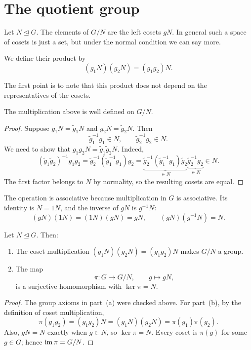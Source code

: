 \documentclass[reqno,11pt]{amsart}
\begin{document}
\makelecturetitle

\section{The quotient group}

Let $N\trianglelefteq G$. The elements of $G/N$ are the left cosets
$gN$. In general such a space of cosets is just a set, but under the normal condition we can say more.

We define their product by
\[
  (g_1N)(g_2N)=(g_1g_2)N.
\]

The first point is to note that this product does not depend on the
representatives of the cosets.

\begin{proposition}\label{prop:well-defined}
The multiplication above is well defined on $G/N$.
\end{proposition}
\begin{proof}
Suppose $g_1N=\widetilde g_1N$ and
$g_2N=\widetilde g_2N$. Then
\[
  \widetilde g_1^{-1}g_1\in N,
  \qquad \widetilde g_2^{-1}g_2\in N.
\]
We need to show that $g_1g_2N=\widetilde g_1\widetilde g_2N$.
Indeed,
\[
  (\widetilde g_1\widetilde g_2)^{-1}g_1g_2
  =\widetilde g_2^{-1}(\widetilde g_1^{-1}g_1)g_2
  =\underbrace{\widetilde g_2^{-1}(\widetilde g_1^{-1}g_1)
       \widetilde g_2}_{\in N}
    \underbrace{\widetilde g_2^{-1}g_2}_{\in N}
  \in N.
\]
The first factor belongs to $N$ by normality, so the resulting
cosets are equal.
\end{proof}

The operation is associative because multiplication in $G$ is
associative. Its identity is $N=1N$, and the inverse of $gN$ is
$g^{-1}N$:
\[
  (gN)(1N)=(1N)(gN)=gN,
  \qquad (gN)(g^{-1}N)=N.
\]

\begin{theorem}\label{thm:quotient-group}\label{thm:quotient-map}
Let $N\trianglelefteq G$. Then:
\begin{enumerate}[label=\textup{(\alph*)}]
\item The coset multiplication
$(g_1N)(g_2N)=(g_1g_2)N$ makes $G/N$ a group.
\item The map
\[
  \pi:G\longrightarrow G/N,\qquad g\longmapsto gN,
\]
is a surjective homomorphism with $\ker\pi=N$.
\end{enumerate}
\end{theorem}
\begin{proof}
The group axioms in part~(a) were checked above. For part~(b), by the
definition of coset multiplication,
\[
  \pi(g_1g_2)=(g_1g_2)N=(g_1N)(g_2N)
  =\pi(g_1)\pi(g_2).
\]
Also, $gN=N$ exactly when $g\in N$, so $\ker\pi=N$.
Every coset is $\pi(g)$ for some $g\in G$; hence
$\operatorname{im}\pi=G/N$.
\end{proof}
\end{document}
